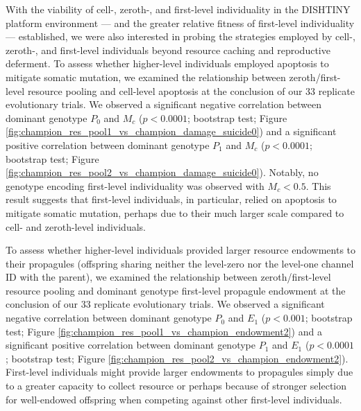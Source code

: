 With the viability of cell-, zeroth-, and first-level individuality in the DISHTINY platform environment --- and the greater relative fitness of first-level individuality --- established, we were also interested in probing the strategies employed by cell-, zeroth-, and first-level individuals beyond resource caching and reproductive deferment.
To assess whether higher-level individuals employed apoptosis to mitigate somatic mutation, we examined the relationship between zeroth/first-level resource pooling and cell-level apoptosis at the conclusion of our 33 replicate evolutionary trials.
We observed a significant negative correlation between dominant genotype $P_0$ and $M_{c}$ ($p < 0.0001$; bootstrap test; Figure \ref{fig:champion_res_pool1_vs_champion_damage_suicide0}) and a significant positive correlation between dominant genotype $P_1$ and $M_{c}$ ($p < 0.0001$; bootstrap test; Figure \ref{fig:champion_res_pool2_vs_champion_damage_suicide0}).
Notably, no genotype encoding first-level individuality was observed with $M_{c} < 0.5$.
This result suggests that first-level individuals, in particular, relied on apoptosis to mitigate somatic mutation, perhaps due to their much larger scale compared to cell- and zeroth-level individuals.

To assess whether higher-level individuals provided larger resource endowments to their propagules (offspring sharing neither the level-zero nor the level-one channel ID with the parent), we examined the relationship between zeroth/first-level resource pooling and dominant genotype first-level propagule endowment at the conclusion of our 33 replicate evolutionary trials.
We observed a significant negative correlation between dominant genotype $P_0$ and $E_1$ ($p < 0.001$; bootstrap test; Figure \ref{fig:champion_res_pool1_vs_champion_endowment2}) and a significant positive correlation between dominant genotype $P_1$ and $E_1$ ($p <  0.0001$; bootstrap test; Figure \ref{fig:champion_res_pool2_vs_champion_endowment2}).
First-level individuals might provide larger endowments to propagules simply due to a greater capacity to collect resource or perhaps because of stronger selection for well-endowed offspring when competing against other first-level individuals.
